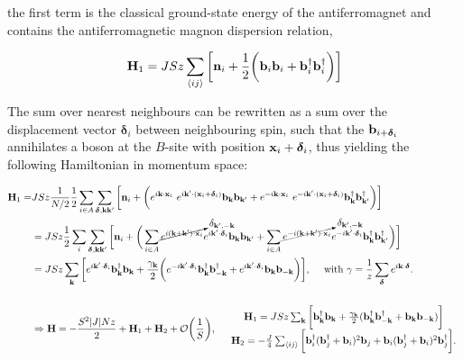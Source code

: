 \documentclass{homework}
\begin{document}
the first term is the classical ground-state energy of the antiferromagnet and contains the antiferromagnetic magnon dispersion relation, 

\begin{equation}
    {\bf H}_1 = J S z\sum_{\langle ij \rangle} 
    \bigg[
    {\bf n}_i + \frac{1}{2} 
    \bigg(
    {\bf b}_i {\bf b}_i + {\bf b}_i^\dagger {\bf b}_i^\dagger \bigg)
    \bigg] 
\end{equation}

The sum over nearest neighbours can be rewritten as a sum over the displacement vector $\bm{\delta}_{i}$ between neighbouring spin, such that the ${\bf b}_{i + \bm{\delta}_i}$ annihilates a boson at the $B$-site with position ${\bf x}_i + \bm{\delta}_i$, thus yielding the following Hamiltonian in momentum space:

\begin{equation}
\begin{split}
    {\bf H}_1 =& J S z \frac{1}{N/2} \frac{1}{2} \sum_{i \in A} \sum_{{\bm{\delta}, {\bf k k'}}} \bigg[ {\bf n}_i + \bigg(e^{i {\bf k} \cdot {\bf x}_i}\ e^{i {\bf k}' \cdot ({\bf x}_i + \bm{\delta}_i)} {\bf b}_{\bf k} {\bf b}_{\bf k'} + e^{-i {\bf k} \cdot {\bf x}_i}\ e^{-i {\bf k}' \cdot ({\bf x}_i + \bm{\delta}_i)} {\bf b}_{\bf k}^\dagger {\bf b}_{\bf k'}^\dagger \bigg) \bigg] \\
    &= J S z \frac{1}{2} \sum_{i} \sum_{{\bm{\delta}, {\bf k k'}}} 
    \bigg[ 
    {\bf n}_i + \bigg( \sum_{i \in A}
    \cancelto{\delta_{{\bf k',-k}}}{e^{i ({\bf k + k'}) \cdot {\bf x}_i}} e^{i {\bf k}' \cdot
    \bm{\delta}_i} {\bf b}_{\bf k} {\bf b}_{\bf k'} 
    +
    \sum_{i \in A}
    \cancelto{\delta_{{\bf k',-k}}}{e^{-i ({\bf k+k'}) \cdot {\bf x}_i}} e^{-i {\bf k}' \cdot \bm{\delta}_i} {\bf b}_{\bf k}^\dagger {\bf b}_{\bf k'}^\dagger
    \bigg)
    \bigg]  \\
    &= JSz \sum_{{\bf k}} \bigg[ e^{i {\bf k}' \cdot
    \bm{\delta}_i} {\bf b}_{{\bf k}}^\dagger {\bf b}_{{\bf k}} + \frac{\gamma_{{\bf k}}}{2} \bigg( e^{-i {\bf k}' \cdot
    \bm{\delta}_i}{\bf b}_{{\bf k}}^\dagger {\bf b}_{-{\bf k}}^\dagger + e^{i {\bf k}' \cdot
    \bm{\delta}_i}{\bf b}_{{\bf k}} {\bf b}_{-{\bf k}}\bigg) \bigg], \quad \textnormal{ with } \gamma = \frac{1}{z} \sum_{\bm{\delta}} e^{i {\bf k} \cdot
    \bm{\delta}}. \\
    \\
    &\Rightarrow {\bf H} = -\frac{S^2 |J| N z}{2} + {\bf H}_1 + {\bf H}_2 + \mathcal{O}\bigg(\frac{1}{S}\bigg), \quad \begin{array}{cc}
         {\bf H}_1 = JSz \sum_{{\bf k}} \bigg[ {\bf b}_{{\bf k}}^\dagger {\bf b}_{{\bf k}} + \frac{\gamma_{{\bf k}}}{2} ({\bf b}_{{\bf k}}^\dagger {\bf b}_{-{\bf k}}^\dagger + {\bf b}_{{\bf k}} {\bf b}_{-{\bf k}}) \bigg]  \\
         {\bf H}_2 = - \frac{J}{4} \sum_{\langle ij \rangle} \bigg[{\bf b}_i^\dagger ({\bf b}_j^\dagger + {\bf b}_i)^2 {\bf b}_j + {\bf b}_i ({\bf b}_j^\dagger + {\bf b}_i)^2 {\bf b}_j^\dagger\bigg].
    \end{array}
\end{split}
\end{equation}
\end{document}
